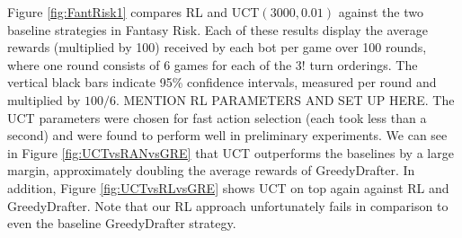 \documentclass[letterpaper]{article}
\numberwithin{equation}{section}
\numberwithin{theorem}{section}
\numberwithin{lemma}{section}
\numberwithin{df}{section}
\begin{document}
Figure \ref{fig:FantRisk1} compares RL and UCT$(3000, 0.01)$ against the two baseline strategies in Fantasy Risk.  Each of these results display the average rewards (multiplied by 100) received by each bot per game over 100 rounds, where one round consists of 6 games for each of the $3!$ turn orderings.  The vertical black bars indicate 95\% confidence intervals, measured per round and multiplied by $100 / 6$.  MENTION RL PARAMETERS AND SET UP HERE.  The UCT parameters were chosen for fast action selection (each took less than a second) and were found to perform well in preliminary experiments.  We can see in Figure \ref{fig:UCTvsRANvsGRE} that UCT outperforms the baselines by a large margin, approximately doubling the average rewards of GreedyDrafter.  In addition, Figure \ref{fig:UCTvsRLvsGRE} shows UCT on top again against RL and GreedyDrafter.  Note that our RL approach unfortunately fails in comparison to even the baseline GreedyDrafter strategy.
\end{document}
